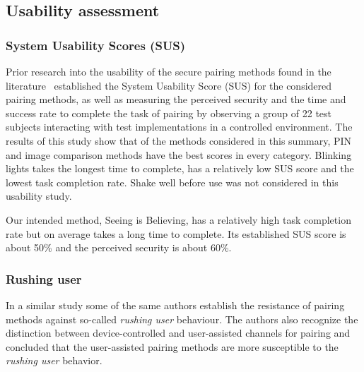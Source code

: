 \documentclass[conference, 11pt]{sty/IEEEtran}
\begin{document}

\subsection{Usability assessment}
\label{ssec:usability_assessment}

\subsubsection{System Usability Scores (SUS)}
Prior research into the usability of the secure pairing methods found in the literature~\cite{kumar2009comparative} established the System Usability Score (SUS) for the considered pairing methods, as well as measuring the perceived security and the time and success rate to complete the task of pairing by observing a group of 22 test subjects interacting with test implementations in a controlled environment.
The results of this study show that of the methods considered in this summary, PIN and image comparison methods have the best scores in every category.
Blinking lights takes the longest time to complete, has a relatively low SUS score and the lowest task completion rate.
Shake well before use was not considered in this usability study.

Our intended method, Seeing is Believing, has a relatively high task completion rate but on average takes a long time to complete.
Its established SUS score is about 50\% and the perceived security is about 60\%.

\subsubsection{Rushing user}
In a similar study \cite{kobsa2009serial} some of the same authors establish the resistance of pairing methods against so-called \textit{rushing user} behaviour.
The authors also recognize the distinction between device-controlled and user-assisted channels for pairing and concluded that the user-assisted pairing methods are more susceptible to the \textit{rushing user} behavior.
\end{document}
